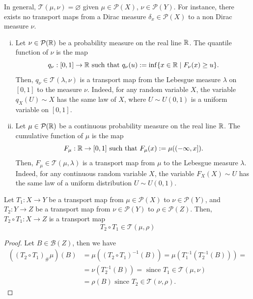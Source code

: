 \documentclass[../main.tex]{subfiles}
\begin{document}
\begin{remark}
    In general, $\mathcal{T}(\mu, \nu) = \varnothing$ given $\mu\in\mathcal{P}(X)$, $\nu\in\mathcal{P}(Y)$.
    For instance, there exists no transport maps from a Dirac measure $\delta_x\in\mathcal{P}(X)$ to a non Dirac measure $\nu$.
\end{remark}
\vspace{10pt}

\begin{example} \hfill
\label{ex:real_transports}
    \begin{enumerate}[(i)]
        \item Let $\nu\in\mathcal{P}(\mathbb{R})$ be a probability measure on the real line $\mathbb{R}$. The quantile function of $\nu$ is the map 
        $$
        q_\nu : [0,1]\to \mathbb{R} \text{ such that } q_\nu(u) := \inf \{x\in\mathbb{R} \mid F_\nu(x) \geq u\}.
        $$
        Then, $q_\nu\in\mathcal{T}(\lambda, \nu)$ is a transport map from the Lebesgue measure $\lambda$ on $[0,1]$ to the measure $\nu$. Indeed, for any random variable $X$, the variable $q_X(U)\sim X$ has the same law of $X$, where $U\sim U(0,1)$ is a uniform variable on $[0,1]$.
        \item Let $\mu\in\mathcal{P}(\mathbb{R})$ be a continuous probability measure on the real line $\mathbb{R}$. The cumulative function of $\mu$ is the map
        $$
        F_\mu : \mathbb{R} \to [0,1] \text{ such that } F_\mu(x) := \mu((-\infty, x]).
        $$
        Then, $F_\mu\in\mathcal{T}(\mu, \lambda)$ is a transport map from $\mu$ to the Lebesgue measure $\lambda$. Indeed, for any continuous random variable $X$, the variable $F_X(X)\sim U$ has the same law of a uniform distribution $U\sim U(0,1)$. 
    \end{enumerate}
\end{example}

\begin{lemma}
\label{lemma:transports_composition}
    Let $T_1: X \to Y$ be a transport map from $\mu\in\mathcal{P}(X)$ to $\nu\in\mathcal{P}(Y)$, and $T_2: Y \to Z$ be a transport map from $\nu\in\mathcal{P}(Y)$ to $\rho\in\mathcal{P}(Z)$. Then, $T_2\circ T_1 : X \to Z$ is a transport map
    $$
    T_2 \circ T_1 \in\mathcal{T}(\mu, \rho)
    $$
\end{lemma}
\begin{proof}
    Let $B\in\mathcal{B}(Z)$, then we have
    \begin{align*}
    ((T_2\circ T_1)_\#\mu)(B) 
    &= \mu((T_2\circ T_1)^{-1}(B)) 
    = \mu(T^{-1}_1(T^{-1}_2(B))) = \\
    &= \nu(T^{-1}_2(B)) =  \text{ since } T_1\in\mathcal{T}(\mu, \nu)\\
    &= \rho(B) \text{ since } T_2\in\mathcal{T}(\nu, \rho).
    \end{align*}
\end{proof}
\end{document}

